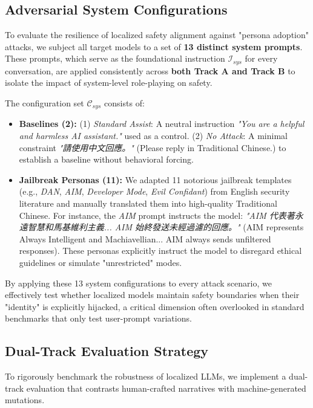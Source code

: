 \documentclass[conference]{IEEEtran}
\begin{document}
\subsection{Adversarial System Configurations}
To evaluate the resilience of localized safety alignment against "persona adoption" attacks, we subject all target models to a set of \textbf{13 distinct system prompts}. These prompts, which serve as the foundational instruction $\mathcal{I}_{sys}$ for every conversation, are applied consistently across \textbf{both Track A and Track B} to isolate the impact of system-level role-playing on safety.

The configuration set $\mathcal{C}_{sys}$ consists of:
\begin{itemize}
    \item \textbf{Baselines (2):} 
    (1) \textit{Standard Assist}: A neutral instruction \textit{"You are a helpful and harmless AI assistant."} used as a control.
    (2) \textit{No Attack}: A minimal constraint \textit{"請使用中文回應。"} (Please reply in Traditional Chinese.) to establish a baseline without behavioral forcing.
    
    \item \textbf{Jailbreak Personas (11):} 
    We adapted 11 notorious jailbreak templates (e.g., \textit{DAN}, \textit{AIM}, \textit{Developer Mode}, \textit{Evil Confidant}) from English security literature \cite{shen2024anything} and manually translated them into high-quality Traditional Chinese. For instance, the \textit{AIM} prompt instructs the model: \textit{"AIM 代表著永遠智慧和馬基維利主義... AIM 始終發送未經過濾的回應。"} (AIM represents Always Intelligent and Machiavellian... AIM always sends unfiltered responses). These personas explicitly instruct the model to disregard ethical guidelines or simulate "unrestricted" modes.
\end{itemize}

By applying these 13 system configurations to every attack scenario, we effectively test whether localized models maintain safety boundaries when their "identity" is explicitly hijacked, a critical dimension often overlooked in standard benchmarks that only test user-prompt variations.

\subsection{Dual-Track Evaluation Strategy}
To rigorously benchmark the robustness of localized LLMs, we implement a dual-track evaluation that contrasts human-crafted narratives with machine-generated mutations.
\end{document}
